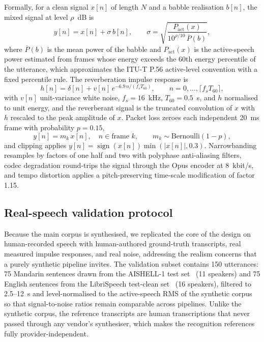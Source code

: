 Formally, for a clean signal $x[n]$ of length $N$ and a babble realisation
$b[n]$, the mixed signal at level $\rho$~dB is
\begin{equation}
y[n] = x[n] + \sigma\, b[n], \qquad
\sigma = \sqrt{\frac{P_{\mathrm{act}}(x)}{10^{\rho/10}\, \overline{P}(b)}},
\label{eq:snr}
\end{equation}
where $\overline{P}(b)$ is the mean power of the babble and
$P_{\mathrm{act}}(x)$ is the active-speech power estimated from frames whose
energy exceeds the 60th energy percentile of the utterance, which
approximates the ITU-T P.56 active-level convention with a fixed percentile
rule. The reverberation impulse response is
\begin{equation}
h[n] = \delta[n] + v[n]\, e^{-6.9\, n / (f_s T_{60})}, \qquad n = 0, \dots,
\lceil f_s T_{60} \rceil,
\label{eq:rir}
\end{equation}
with $v[n]$ unit-variance white noise, $f_s = 16$~kHz, $T_{60} = 0.5$~s, and
$h$ normalised to unit energy, and the reverberant signal is the truncated
convolution of $x$ with $h$ rescaled to the peak amplitude of $x$. Packet
loss zeroes each independent 20~ms frame with probability $p = 0.15$,
\begin{equation}
y[n] = m_k\, x[n], \quad n \in \text{frame } k, \qquad m_k \sim
\mathrm{Bernoulli}(1 - p),
\label{eq:pl}
\end{equation}
and clipping applies $y[n] = \operatorname{sign}(x[n]) \min(|x[n]|, 0.3)$.
Narrowbanding resamples by factors of one half and two with polyphase
anti-aliasing filters, codec degradation round-trips the signal through the
Opus encoder at 8~kbit/s, and tempo distortion applies a pitch-preserving
time-scale modification of factor 1.15.

\subsection{Real-speech validation protocol}
\label{sec:methods:real}

Because the main corpus is synthesised, we replicated the core of the
design on human-recorded speech with human-authored ground-truth
transcripts, real measured impulse responses, and real noise, addressing
the realism concerns that a purely synthetic pipeline invites. The
validation subset contains 150 utterances: 75 Mandarin sentences drawn
from the AISHELL-1 test set~\citep{bu2017aishell} (11 speakers) and 75
English sentences from the LibriSpeech test-clean
set~\citep{panayotov2015librispeech} (16 speakers), filtered to 2.5--12~s
and level-normalised to the active-speech RMS of the synthetic corpus so
that signal-to-noise ratios remain comparable across pipelines. Unlike the
synthetic corpus, the reference transcripts are human transcriptions that
never passed through any vendor's synthesiser, which makes the recognition
references fully provider-independent.

